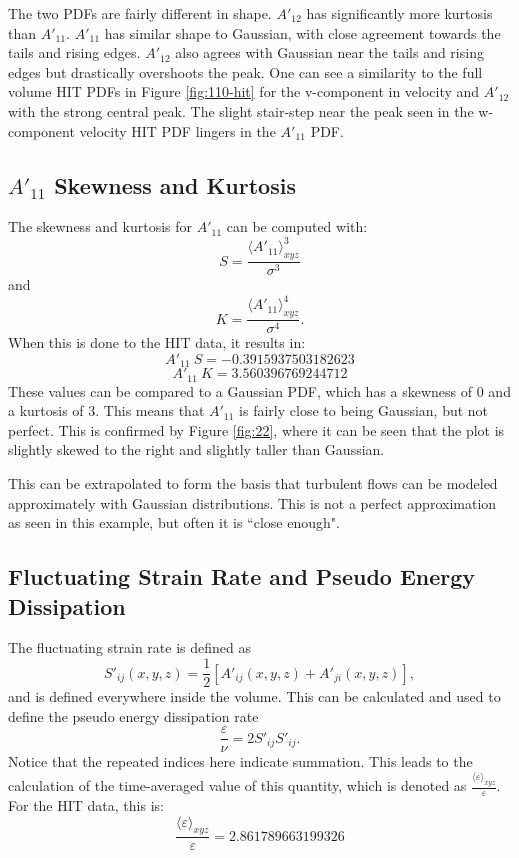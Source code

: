 \documentclass[12pt]{article}
\begin{document}
The two PDFs are fairly different in shape. $A'_{12}$ has significantly more kurtosis than $A'_{11}$. $A'_{11}$ has similar shape to Gaussian, with close agreement towards the tails and rising edges. $A'_{12}$ also agrees with Gaussian near the tails and rising edges but drastically overshoots the peak. One can see a similarity to the full volume HIT PDFs in Figure \ref{fig:110-hit} for the v-component in velocity and $A'_{12}$ with the strong central peak. The slight stair-step near the peak seen in the w-component velocity HIT PDF lingers in the $A'_{11}$ PDF. 

\subsection{$A'_{11}$ Skewness and Kurtosis}
The skewness and kurtosis for $A'_{11}$ can be computed with:
\[
S = \frac{\langle A'_{11}\rangle_{xyz}^3}{\sigma^3}
\]
and 
\[
K = \frac{\langle A'_{11}\rangle_{xyz}^4}{\sigma^4}.
\]
When this is done to the HIT data, it results in:
\[
A'_{11}~S = -0.3915937503182623
\]
\[
A'_{11}~K = 3.560396769244712
\]
These values can be compared to a Gaussian PDF, which has a skewness of 0 and a kurtosis of 3. This means that $A'_{11}$ is fairly close to being Gaussian, but not perfect. This is confirmed by Figure \ref{fig:22}, where it can be seen that the plot is slightly skewed to the right and slightly taller than Gaussian. 

This can be extrapolated to form the basis that turbulent flows can be modeled approximately with Gaussian distributions. This is not a perfect approximation as seen in this example, but often it is ``close enough". 

\subsection{Fluctuating Strain Rate and Pseudo Energy Dissipation}
The fluctuating strain rate is defined as 
\[
S'_{ij}(x,y,z) = \frac{1}{2}\left[ A'_{ij}(x,y,z)+A'_{ji}(x,y,z) \right],
\]
and is defined everywhere inside the volume. This can be calculated and used to define the pseudo energy dissipation rate 
\[
\frac{\varepsilon}{\nu}=2S'_{ij}S'_{ij}.
\]
Notice that the repeated indices here indicate summation. This leads to the calculation of the time-averaged value of this quantity, which is denoted as $\frac{\langle \varepsilon\rangle_{xyz}}{\varepsilon}$. For the HIT data, this is:
\[
\frac{\langle \varepsilon\rangle_{xyz}}{\varepsilon} = 2.861789663199326
\]
\end{document}
